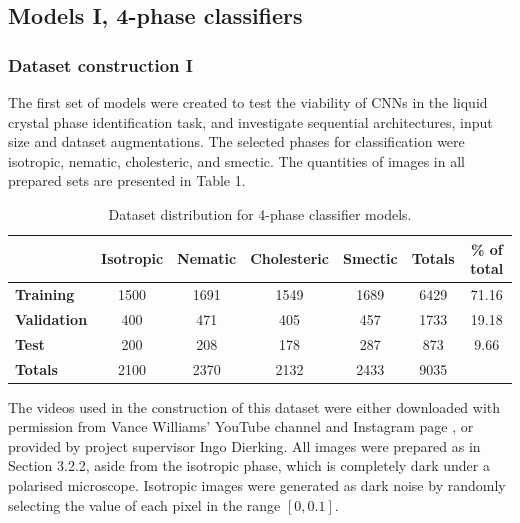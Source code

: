 \documentclass[12pt]{article}
\begin{document}
\subsection{Models I, 4-phase classifiers}
\subsubsection{Dataset construction I}
The first set of models were created to test the viability of CNNs in the liquid crystal phase identification task, and investigate sequential architectures, input size and dataset augmentations. The selected phases for classification were isotropic, nematic, cholesteric, and smectic. The quantities of images in all prepared sets are presented in Table 1.
\begin{table}[!htb]
\begin{center}
\caption{Dataset distribution for 4-phase classifier models.}
\begin{tabular}{l|c|c|c|c|c|c}
\toprule
& \textbf{Isotropic} & \textbf{Nematic} & \textbf{Cholesteric} & \textbf{Smectic} & \textbf{Totals} & \textbf{\% of total}\\
\midrule
\textbf{Training} & 1500 & 1691 & 1549 & 1689 & 6429 & 71.16\\
\textbf{Validation} & 400 & 471 & 405 & 457 & 1733 & 19.18\\
\textbf{Test} & 200 & 208 & 178 & 287 & 873 & 9.66\\
\midrule
\textbf{Totals} & 2100 & 2370 & 2132 & 2433 & 9035\\
\bottomrule
\end{tabular}
\end{center}
\end{table}
The videos used in the construction of this dataset were either downloaded with permission from Vance Williams' YouTube channel and Instagram page \cite{Williams20a, Williams20b}, or provided by project supervisor Ingo Dierking. All images were prepared as in Section 3.2.2, aside from the isotropic phase, which is completely dark under a polarised microscope. Isotropic images were generated as dark noise by randomly selecting the value of each pixel in the range $[0,0.1]$.
\end{document}
